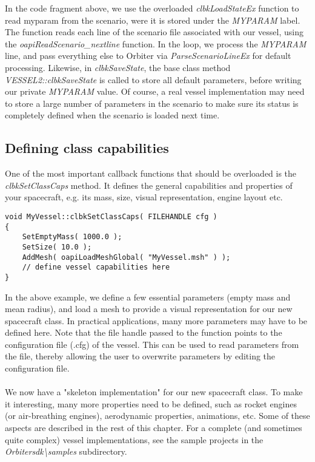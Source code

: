 \documentclass[Orbiter Developer Manual.tex]{subfiles}
\begin{document}
\noindent
In the code fragment above, we use the overloaded \textit{clbkLoadStateEx} function to read myparam from the scenario, were it is stored under the \textit{MYPARAM} label. The function reads each line of the scenario file associated with our vessel, using the \textit{oapiReadScenario\_nextline} function. In the loop, we process the \textit{MYPARAM} line, and pass everything else to Orbiter via \textit{ParseScenarioLineEx} for default processing. Likewise, in \textit{clbkSaveState}, the base class method \textit{VESSEL2::clbkSaveState} is called to store all default parameters, before writing our private \textit{MYPARAM} value. Of course, a real vessel implementation may need to store a large number of parameters in the scenario to make sure its status is completely defined when the scenario is loaded next time.


\subsection{Defining class capabilities}
One of the most important callback functions that should be overloaded is the \textit{clbkSetClassCaps} method. It defines the general capabilities and properties of your spacecraft, e.g. its mass, size, visual representation, engine layout etc.

\begin{lstlisting}
void MyVessel::clbkSetClassCaps( FILEHANDLE cfg )
{
	SetEmptyMass( 1000.0 );
	SetSize( 10.0 );
	AddMesh( oapiLoadMeshGlobal( "MyVessel.msh" ) );
	// define vessel capabilities here
}
\end{lstlisting}

\noindent
In the above example, we define a few essential parameters (empty mass and mean radius), and load a mesh to provide a visual representation for our new spacecraft class. In practical applications, many more parameters may have to be defined here. Note that the file handle passed to the function points to the configuration file (.cfg) of the vessel. This can be used to read parameters from the file, thereby allowing the user to overwrite parameters by editing the configuration file.\\
\\
We now have a "skeleton implementation" for our new spacecraft class. To make it interesting, many more properties need to be defined, such as rocket engines (or air-breathing engines), aerodynamic properties, animations, etc. Some of these aspects are described in the rest of this chapter. For a complete (and sometimes quite complex) vessel implementations, see the sample projects in the \textit{Orbitersdk\textbackslash samples} subdirectory.
\end{document}
